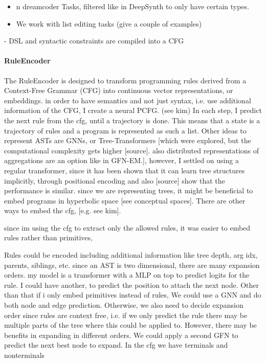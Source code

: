 \begin{itemize}
    \item n dreamcoder Tasks, filtered like in DeepSynth to only have certain types.
    \item We work with list editing tasks (give a couple of examples)
\end{itemize}






- DSL and syntactic constraints are compiled into a CFG


\paragraph{RuleEncoder}
The RuleEncoder is designed to transform programming rules derived from a Context-Free Grammar (CFG) into continuous vector representations, or embeddings.
in order to have semantics and not just syntax, i.e. use additional information of the CFG, I create a neural PCFG. (see kim)
In each step, I predict the next rule from the cfg, until a trajectory is done. This means that a state is a trajectory of rules and a program is represented as such a list.
Other ideas to represent ASTs are GNNs, or Tree-Transformers [which were explored, but the computational complexity gets higher [source]. also distributed representations of aggregations are an option like in GFN-EM.], however, I settled on using a regular transformer, since it has been shown that it can learn tree structures implicitly, through positional encoding and also [source] show that the performance is similar.
since we are representing trees, it might be beneficial to embed programs in hyperbolic space [see conceptual spaces]. 
There are other ways to embed the cfg, [e.g. see kim].



since im using the cfg to extract only the allowed rules, it was easier to embed rules rather than primitives, 

Rules could be encoded including additional information like tree depth, arg idx, parents, siblings, etc. 
since an AST is two dimensional, there are many expansion orders. 
my model is a transformer with a MLP on top to predict logits for the rule. I could have another, to predict the position to attach the next node. Other than that if i only embed primitives instead of rules, 
We could use a GNN and do both node and edge prediction. 
Otherwise, we also need to decide expansion order since rules are context free, i.e. if we only predict the rule there may be multiple parts of the tree where this could be applied to. However, there may be benefits in expanding in different orders. We could apply a second GFN to predict the next best node to expand.
In the cfg we have terminals and nonterminals

